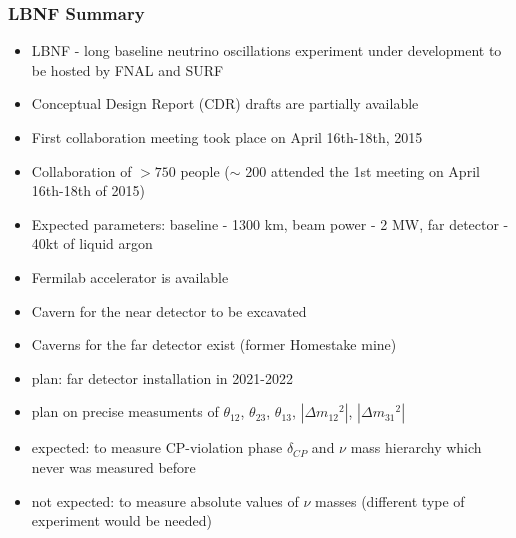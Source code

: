 \begin{frame}\frametitle{LBNF Summary}
  \scriptsize
  \begin{itemize}

     \item LBNF - long baseline neutrino oscillations experiment under development to be hosted by FNAL and SURF 
     \item Conceptual Design Report (CDR) drafts are partially available
     \item First collaboration meeting took place on April 16th-18th, 2015
     \item Collaboration of $>750$ people ($\sim$ 200 attended the 1st meeting on April 16th-18th of 2015)
     \item Expected parameters: baseline - 1300 km, beam power - 2 MW, far detector - 40kt of liquid argon
     \item Fermilab accelerator is available 
     \item Cavern for the near detector to be excavated
     \item Caverns for the far detector exist (former Homestake mine)
     \item plan: far detector installation in 2021-2022
     \item plan on precise measuments of $\theta_{12}$, $\theta_{23}$, $\theta_{13}$, $|\Delta{m_{12}}^2|$, $|\Delta{m_{31}}^2|$
     \item expected: to measure CP-violation phase $\delta_{CP}$ and $\nu$ mass hierarchy which never was measured before
     \item not expected: to measure absolute values of $\nu$ masses (different type of experiment would be needed)
  \end{itemize}
\end{frame}
